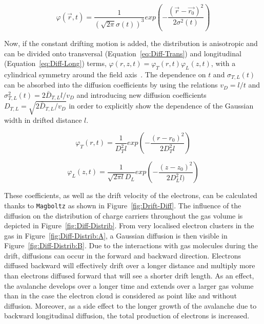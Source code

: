 	\begin{equation}
	\label{eq:Diff-Gauss}
	\varphi(\overrightarrow{r},t) = \frac{1}{\left(\sqrt{2\pi}\sigma(t)\right)^3} exp\left( -\frac{(\overrightarrow{r} - \overrightarrow{r_0})^2}{2\sigma^2(t)} \right)
	\end{equation}
	
	Now, if the constant drifting motion is added, the distribution is anisotropic and can be divided onto transversal (Equation~\ref{eq:Diff-Trans}) and longitudinal (Equation~\ref{eq:Diff-Long}) terms, $\varphi(r,z,t) = \varphi_T(r,t)\varphi_L(z,t)$, with a cylindrical symmetry around the field axis~\cite{LIPPMANN2003}. The dependence on $t$ and $\sigma_{T,L}(t)$ can be absorbed into the diffusion coefficients by using the relations $v_D = l/t$ and $\sigma_{T,L}^2(t) = 2\bar{D}_{T,L}l/v_D$ and introducing new diffusion coefficients $D_{T,L} = \sqrt{2\bar{D}_{T,L}/v_D}$ in order to explicitly show the dependence of the Gaussian width in drifted distance $l$.
	
\endgroup
	
	\begin{equation}
	\label{eq:Diff-Trans}
	\varphi_T(r,t) = \frac{1}{D_T^2l} exp\left( -\frac{(r - r_0)^2}{2D_T^2l} \right)
	\end{equation}
	
	\begin{equation}
	\label{eq:Diff-Long}
	\varphi_L(z,t) = \frac{1}{\sqrt{2\pi l}D_L} exp\left( -\frac{(z - z_0)^2}{2D_L^2l)} \right)
	\end{equation}
	
	These coefficients, as well as the drift velocity of the electrons, can be calculated thanks to \texttt{Magboltz} as shown in Figure~\ref{fig:Drift-Diff}. The influence of the diffusion on the distribution of charge carriers throughout the gas volume is depicted in Figure~\ref{fig:Diff-Distrib}. From very localised electron clusters in the gas in Figure~\ref{fig:Diff-Distrib:A}, a Gaussian diffusion is then visible in Figure~\ref{fig:Diff-Distrib:B}. Due to the interactions with gas molecules during the drift, diffusions can occur in the forward and backward direction. Electrons diffused backward will effectively drift over a longer distance and multiply more than electrons diffused forward that will see a shorter drift length. As an effect, the avalanche develops over a longer time and extends over a larger gas volume than in the case the electron cloud is considered as point like and without diffusion. Moreover, as a side effect to the longer growth of the avalanche due to backward longitudinal diffusion, the total production of electrons is increased.
	
